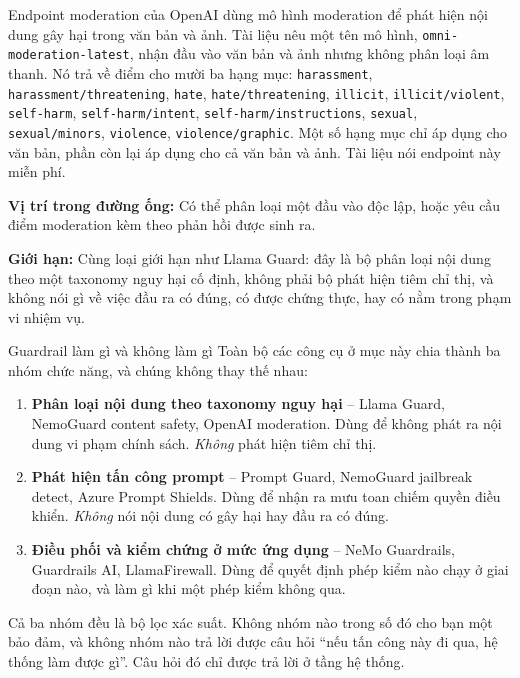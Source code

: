 Endpoint moderation của OpenAI dùng mô hình moderation để phát hiện nội dung gây hại trong văn bản và ảnh. Tài liệu nêu một tên mô hình, \texttt{omni-\allowbreak moderation-\allowbreak latest}, nhận đầu vào văn bản và ảnh nhưng không phân loại âm thanh. Nó trả về điểm cho mười ba hạng mục: \texttt{harassment}, \texttt{harassment/\allowbreak threatening}, \texttt{hate}, \texttt{hate/threatening}, \texttt{illicit}, \texttt{illicit/violent}, \texttt{self-harm}, \texttt{self-harm/intent}, \texttt{self-\allowbreak harm/\allowbreak instructions}, \texttt{sexual}, \texttt{sexual/minors}, \texttt{violence}, \texttt{violence/graphic}. Một số hạng mục chỉ áp dụng cho văn bản, phần còn lại áp dụng cho cả văn bản và ảnh. Tài liệu nói endpoint này miễn phí.

\textbf{Vị trí trong đường ống:} Có thể phân loại một đầu vào độc lập, hoặc yêu cầu điểm moderation kèm theo phản hồi được sinh ra.

\textbf{Giới hạn:} Cùng loại giới hạn như Llama Guard: đây là bộ phân loại nội dung theo một taxonomy nguy hại cố định, không phải bộ phát hiện tiêm chỉ thị, và không nói gì về việc đầu ra có đúng, có được chứng thực, hay có nằm trong phạm vi nhiệm vụ.

\begin{assess}{Guardrail làm gì và không làm gì}
Toàn bộ các công cụ ở mục này chia thành ba nhóm chức năng, và chúng không thay thế nhau:

\begin{enumerate}
	\item \textbf{Phân loại nội dung theo taxonomy nguy hại} -- Llama Guard, NemoGuard content safety, OpenAI moderation. Dùng để không phát ra nội dung vi phạm chính sách. \emph{Không} phát hiện tiêm chỉ thị.
	\item \textbf{Phát hiện tấn công prompt} -- Prompt Guard, NemoGuard jailbreak detect, Azure Prompt Shields. Dùng để nhận ra mưu toan chiếm quyền điều khiển. \emph{Không} nói nội dung có gây hại hay đầu ra có đúng.
	\item \textbf{Điều phối và kiểm chứng ở mức ứng dụng} -- NeMo Guardrails, Guardrails AI, LlamaFirewall. Dùng để quyết định phép kiểm nào chạy ở giai đoạn nào, và làm gì khi một phép kiểm không qua.
\end{enumerate}

Cả ba nhóm đều là bộ lọc xác suất. Không nhóm nào trong số đó cho bạn một bảo đảm, và không nhóm nào trả lời được câu hỏi ``nếu tấn công này đi qua, hệ thống làm được gì''. Câu hỏi đó chỉ được trả lời ở tầng hệ thống.
\end{assess}

